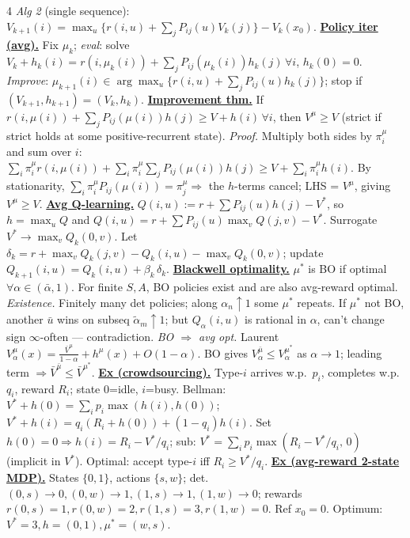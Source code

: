 \documentclass[10pt,landscape,letterpaper]{article}
\let\oldtextbf\textbf
\renewcommand{\textbf}[1]{\uline{\oldtextbf{#1}}}
\begin{document}
\begin{multicols*}{4}
\emph{Alg 2} (single sequence): \(V_{k+1}(i){=}\max_u\{r(i,u){+}\!\sum_j\!P_{ij}(u)V_k(j)\}{-}V_k(x_0)\).
\textbf{Policy iter (avg).} Fix \(\mu_k\); \emph{eval}: solve
\(V_k{+}h_k(i){=}r(i,\mu_k(i)){+}\!\sum_j\!P_{ij}(\mu_k(i))h_k(j)\,\forall i\), \(h_k(0){=}0\).
\emph{Improve}: \(\mu_{k+1}(i)\!\in\!\arg\max_u\{r(i,u){+}\!\sum_j\!P_{ij}(u)h_k(j)\}\); stop if \((V_{k+1},h_{k+1}){=}(V_k,h_k)\).
\textbf{Improvement thm.} If \(r(i,\mu(i)){+}\!\sum_j\!P_{ij}(\mu(i))h(j)\ge V{+}h(i)\,\forall i\), then \(V^\mu\ge V\) (strict if strict holds at some positive-recurrent state).
\emph{Proof.} Multiply both sides by \(\pi^\mu_i\) and sum over \(i\):
\(\sum_i\pi^\mu_i r(i,\mu(i)){+}\sum_i\pi^\mu_i\!\sum_j\!P_{ij}(\mu(i))h(j)\ge V{+}\!\sum_i\pi^\mu_i h(i)\).
By stationarity, \(\sum_i\pi^\mu_i P_{ij}(\mu(i)){=}\pi^\mu_j\Rightarrow\) the \(h\)-terms cancel; LHS = \(V^\mu\), giving \(V^\mu\ge V\).
\textbf{Avg Q-learning.} \(Q(i,u){:=}r{+}\!\sum\!P_{ij}(u)h(j){-}V^*\), so \(h{=}\max_u Q\) and
\(Q(i,u){=}r{+}\!\sum\!P_{ij}(u)\!\max_v Q(j,v){-}V^*\).
Surrogate \(V^*\!\to\!\max_v\!Q_k(0,v)\). Let \(\delta_k{=}r{+}\!\max_v\!Q_k(j,v){-}Q_k(i,u){-}\!\max_v\!Q_k(0,v)\);
update \(Q_{k+1}(i,u){=}Q_k(i,u){+}\beta_k\,\delta_k\).
\textbf{Blackwell optimality.} \(\mu^*\) is BO if optimal \(\forall\alpha\in(\bar\alpha,1)\). For finite \(S,A\), BO policies exist and are also avg-reward optimal.
\emph{Existence.} Finitely many det policies; along \(\alpha_n{\uparrow}1\) some \(\mu^*\) repeats.
If \(\mu^*\) not BO, another \(\bar u\) wins on subseq \(\tilde\alpha_m{\uparrow}1\);
but \(Q_\alpha(i,u)\) is rational in \(\alpha\), can't change sign \(\infty\)-often — contradiction.
\emph{BO \(\Rightarrow\) avg opt.} Laurent \(V^\mu_\alpha(x){=}\tfrac{\bar V^\mu}{1-\alpha}{+}h^\mu(x){+}O(1{-}\alpha)\).
BO gives \(V^{\bar\mu}_\alpha\!\le\!V^{\mu^*}_\alpha\) as \(\alpha{\to}1\); leading term \(\Rightarrow\bar V^{\bar\mu}\!\le\!\bar V^{\mu^*}\).
\textbf{Ex (crowdsourcing).} Type-\(i\) arrives w.p.\ \(p_i\), completes w.p.\ \(q_i\), reward \(R_i\); state \(0\){=}idle, \(i\){=}busy. Bellman: \(V^*{+}h(0){=}\!\sum_i\!p_i\max(h(i),h(0))\); \(V^*{+}h(i){=}q_i(R_i{+}h(0)){+}(1{-}q_i)h(i)\). Set \(h(0){=}0\Rightarrow h(i){=}R_i{-}V^*/q_i\); sub: \(V^*{=}\!\sum_i\!p_i\max(R_i{-}V^*/q_i,\,0)\) (implicit in \(V^*\)). Optimal: accept type-\(i\) iff \(R_i{\ge}V^*/q_i\).
\textbf{Ex (avg-reward 2-state MDP).} States \(\{0,1\}\), actions \(\{s,w\}\); det.\ \((0,s){\to}0,(0,w){\to}1,(1,s){\to}1,(1,w){\to}0\); rewards \(r(0,s){=}1,r(0,w){=}2,r(1,s){=}3,r(1,w){=}0\). Ref \(x_0{=}0\). Optimum: \(V^*{=}3,h{=}(0,1),\mu^*{=}(w,s)\).

\end{multicols*}
\end{document}
